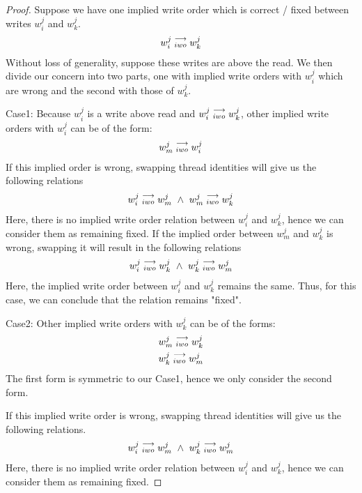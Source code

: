         \begin{proof}
            Suppose we have one implied write order which is correct / fixed between writes $w_i^j$ and $w_k^j$.
            \begin{align}
                w_i^j\stackrel{\longrightarrow}{_{iwo}}w_k^j
            \end{align}
            Without loss of generality, suppose these writes are above the read. We then divide our concern into two parts, one with implied write orders with $w_i^j$ which are wrong and the second with those of $w_k^j$.

            Case1: 
            Because $w_i^j$ is a write above read and $w_i^j\stackrel{\longrightarrow}{_{iwo}}w_k^j$, other implied write orders with $w_i^j$ can be of the form:
            \begin{align}
                w_m^j\stackrel{\longrightarrow}{_{iwo}}w_i^j
            \end{align}
            If this implied order is wrong, swapping thread identities will  give us the following relations 
            \begin{align}
                \reln{w_i^j}{iwo}{w_m^j} \ \wedge \ \reln{w_m^j}{iwo}{w_k^j}  
            \end{align}  
            Here, there is no implied write order relation between $w_i^j$ and $w_k^j$, hence we can consider them as remaining fixed. 
            If the implied order between $w_m^j$ and $w_k^j$ is wrong, swapping it will result in the following relations
            \begin{align}
                \reln{w_i^j}{iwo}{w_k^j} \ \wedge \ \reln{w_k^j}{iwo}{w_m^j}  
            \end{align}  
            Here, the implied write order between $w_i^j$ and $w_k^j$ remains the same. Thus, for this case, we can conclude that the relation remains "fixed".

            Case2: 
            Other implied write orders with $w_k^j$ can be of the forms:
            \begin{align}
                w_m^j\stackrel{\longrightarrow}{_{iwo}}w_k^j \\ 
                w_k^j\stackrel{\longrightarrow}{_{iwo}}w_m^j
            \end{align} 
            The first form is symmetric to our Case1, hence we only consider the second form. 

            If this implied write order is wrong, swapping thread identities will give us the following relations. 
            \begin{align}
                \reln{w_i^j}{iwo}{w_m^j} \ \wedge \ \reln{w_k^j}{iwo}{w_m^j}
            \end{align}
            Here, there is no implied write order relation between $w_i^j$ and $w_k^j$, hence we can consider them as remaining fixed. 


\end{proof}
